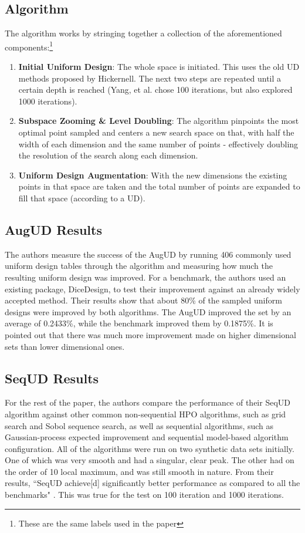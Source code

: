 \documentclass[twoside,11pt]{article}
\begin{document}
\subsection{Algorithm}
The algorithm works by stringing together a collection of the aforementioned components:\footnote{These are the same labels used in the paper}
\begin{enumerate}
\item {\bf Initial Uniform Design}: The whole space is initiated. This uses the old UD methods proposed by Hickernell. The next two steps are repeated until a certain depth is reached (Yang, et al. chose 100 iterations, but also explored 1000 iterations). 
\item {\bf Subspace Zooming \& Level Doubling}: The algorithm pinpoints the most optimal point sampled and centers a new search space on that, with half the width of each dimension and the same number of points - effectively doubling the resolution of the search along each dimension.
\item {\bf Uniform Design Augmentation}: With the new dimensions the existing points in that space are taken and the total number of points are expanded to fill that space (according to a UD). 
\end{enumerate}

\subsection{AugUD Results}
The authors measure the success of the AugUD by running 406 commonly used uniform design tables through the algorithm and measuring how much the resulting uniform design was improved. For a benchmark, the authors used an existing package, DiceDesign, to test their improvement against an already widely accepted method. Their results show that about 80\% of the sampled uniform designs were improved by both algorithms. The AugUD improved the set by an average of 0.2433\%, while the benchmark improved them by 0.1875\%. It is pointed out that there was much more improvement made on higher dimensional sets than lower dimensional ones.

\subsection{SeqUD Results}
For the rest of the paper, the authors compare the performance of their SeqUD algorithm against other common non-sequential HPO algorithms, such as grid search and Sobol sequence search, as well as sequential algorithms, such as Gaussian-process expected improvement and sequential model-based algorithm configuration. All of the algorithms were run on two synthetic data sets initially. One of which was very smooth and had a singular, clear peak. The other had on the order of 10 local maximum, and was still smooth in nature. From their results, ``SeqUD achieve[d] significantly better performance as compared to all the benchmarks" \citep{yang2021hyperparameter}. This was true for the test on 100 iteration and 1000 iterations.
\end{document}
